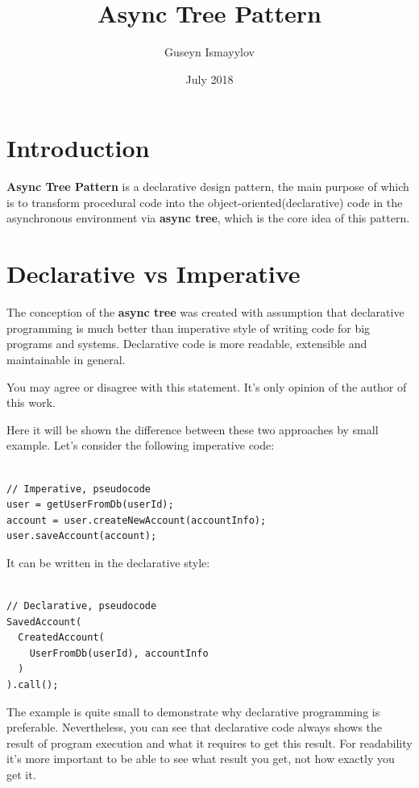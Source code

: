 \documentclass{article}
\title{Async Tree Pattern}
\author{Guseyn Ismayylov}
\date{July 2018}
\begin{document}
\maketitle

\section{Introduction}

\textbf{Async Tree Pattern} is a declarative design pattern, the main purpose of which is to transform procedural code into the object-oriented(declarative) code in the asynchronous environment via \textbf{async tree}, which is the core idea of this pattern.

\section{Declarative vs Imperative}

The conception of the \textbf{async tree} was created with assumption that declarative programming is much better than imperative style of writing code for big programs and systems. Declarative code is more readable, extensible and maintainable in general.

You may agree or disagree with this statement. It's only opinion of the author of this work.

Here it will be shown the difference between these two approaches by small example. Let's consider the following imperative code:  

\begin{lstlisting}

// Imperative, pseudocode
user = getUserFromDb(userId);
account = user.createNewAccount(accountInfo);
user.saveAccount(account);

\end{lstlisting}

It can be written in the declarative style:

\begin{lstlisting}

// Declarative, pseudocode
SavedAccount(
  CreatedAccount(
    UserFromDb(userId), accountInfo
  )
).call();

\end{lstlisting}

The example is quite small to demonstrate why declarative programming is preferable. Nevertheless, you can see that declarative code always shows the result of program execution and what it requires to get this result. For readability it's more important to be able to see what result you get, not how exactly you get it.
\end{document}
